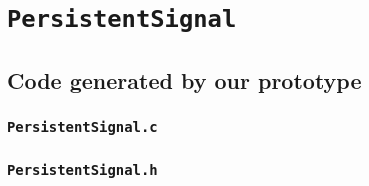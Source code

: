 
\section{\texorpdfstring{\texttt{PersistentSignal}}{PersistentSignal}}
\label{PersistentSignal-code-section}

\subsection{Code generated by our prototype}
\label{PersistentSignal-code-our-subsection}

\subsubsection{\texttt{PersistentSignal.c}}\hfill


\subsubsection{\texttt{PersistentSignal.h}}\hfill



% 

% 

% 

% 

